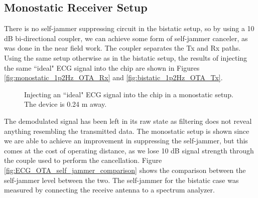 \documentclass[12pt,onecolumn,titlepage]{article}
\begin{document}
\subsection{Monostatic Receiver Setup}
\indent \indent There is no self-jammer suppressing circuit in the bistatic setup, so by using a 10 dB bi-directional coupler, we can achieve some form of self-jammer canceler, as was done in the near field work. The coupler separates the Tx and Rx paths. Using the same setup otherwise as in the bistatic setup, the results of injecting the same ``ideal" ECG signal into the chip are shown in Figures \ref{fig:monostatic_1p2Hz_OTA_Rx} and \ref{fig:bistatic_1p2Hz_OTA_Tx}.



\begin{figure}[htbp]
	\centering
		\quad
	\label{fig:bistatic_ECG_OTA}
	\caption{Injecting an ``ideal" ECG signal into the chip in a monostatic setup. The device is 0.24 m away.}
\end{figure}


The demodulated signal has been left in its raw state as filtering does not reveal anything resembling the transmitted data. The monostatic setup is shown since we are able to achieve an improvement in suppressing the self-jammer, but this comes at the cost of operating distance, as we lose 10 dB signal strength through the couple used to perform the cancellation. Figure \ref{fig:ECG_OTA_self_jammer_comparison} shows the comparison between the self-jammer level between the two. The self-jammer for the bistatic case was measured by connecting the receive antenna to a spectrum analyzer.
\end{document}
